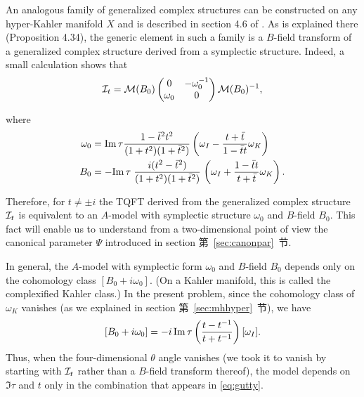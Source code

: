 An analogous family of generalized complex structures can be
constructed on any hyper-Kahler manifold $X$ and is described in
section 4.6 of \cite{ref67}.  As is explained there (Proposition
4.34), the generic element in such a family is a $B$-field
transform of a generalized complex structure derived from a
symplectic structure. Indeed, a small calculation shows that
\setcounter{equation}{30}
\begin{equation}\label{eq:huffy}
{\cal I}_t={\cal M}(B_0)\left(\begin{matrix}0 &
-\omega_0^{-1}\\ \omega_0 & 0\\\end{matrix}\right){\cal M}(B_0)^{-1},
\end{equation}

where %
\setcounter{equation}{31}
\begin{equation}\label{eq:nutty}
\begin{aligned}\omega_0 & = {\rm Im}\,\tau{1-\bar
t{}^2t^2\over (1+t^2)(1+\bar t{}^2)}\left(\omega_I-{t+\bar t\over
1-\bar t t}\omega_K\right)\\
                      B_0 &= -{\rm Im}\,\tau\left.{i(t^2-\bar t{}^2)\over(1+t^2)(1+\bar
                      t{}^2)}\right.
                      \left(\omega_I+{1-\bar t t\over t+\bar t}\omega_K\right).\\\end{aligned}
\end{equation}

Therefore, for $t\neq \pm i$ the TQFT derived from the generalized
complex structure ${\cal I}_t$ is equivalent to an $A$-model with
symplectic structure $\omega_0$ and $B$-field $B_0$.  This fact
will enable us to understand from a two-dimensional point of view
the canonical parameter $\Psi$ introduced in section 第~\ref{sec:canonpar}~节.

In general, the $A$-model with symplectic form $\omega_0$ and
$B$-field $B_0$ depends only on the cohomology class
$[B_0+i\omega_0]$.  (On a Kahler manifold, this is called the
complexified Kahler class.)  In the present problem, since the
cohomology class of $\omega_K$ vanishes (as we explained in
section 第~\ref{sec:mhhyper}~节), we have %
\setcounter{equation}{32}
\begin{equation}\label{eq:gutty}
[B_0+i\omega_0]=-i\,{\rm
Im}\,\tau\left(t-t^{-1}\over t+t^{-1}\right) [\omega_I].
\end{equation}
 Thus,
when the four-dimensional $\theta$ angle vanishes (we took it to
vanish by starting with ${\cal I}_t$ rather than a $B$-field
transform thereof), the model depends on ${\Im}\tau$ and $t$ only
in the combination that appears in \eqref{eq:gutty}.

